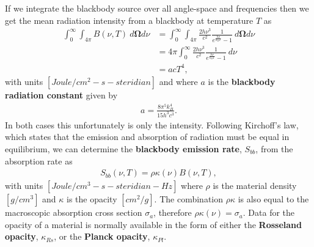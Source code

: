 \documentclass[10pt,letterpaper,notitlepage]{article}
\numberwithin{equation}{section}
\newcommand{\Omegabf}{\mathbf{\Omega}}
\newcommand{\beqn}{\begin{equation}\begin{aligned}}
\newcommand{\eeqn}{\end{aligned}\end{equation}}
\begin{document}
If we integrate the blackbody source over all angle-space and frequencies then we get the mean radiation intensity from a blackbody at temperature $T$ as
\beqn 
\int_0^\infty \int_{4\pi}  B(\nu, T) \ d\Omegabf d\nu
&=\int_0^\infty \int_{4\pi}  \frac{2h\nu^3}{c^2} \frac{1}{e^{\frac{h\nu}{k_B T}} - 1  } \ d\Omegabf d\nu \\
&=4\pi \int_0^\infty \frac{2h\nu^3}{c^2} \frac{1}{e^{\frac{h\nu}{k_B T}} - 1  } \  d\nu \\
&= a c T^4,
\eeqn 
with units $[Joule/cm^2 {-} s {-} steridian]$ and where $a$ is the \textbf{blackbody radiation constant} given by
\beqn 
a = \frac{8\pi^5 k_B^4}{15 h^3 c^3}.
\eeqn 
\newline
\newline
In both cases this unfortunately is only the intensity. Following Kirchoff's law, which states that the emission and absorption of radiation must be equal in equilibrium, we can determine the \textbf{blackbody emission rate}, $S_{bb}$, from the absorption rate as
\beqn 
S_{bb}(\nu, T) = \rho \kappa(\nu) B(\nu, T),
\eeqn 
with units $[Joule/cm^3 {-} s {-} steridian {-} Hz]$
where $\rho$ is the material density $[g/cm^3]$ and $\kappa$ is the opacity $[cm^2/g]$. The combination $\rho \kappa$ is also equal to the macroscopic absorption cross section $\sigma_a$, therefore $\rho \kappa(\nu) = \sigma_a$. Data for the opacity of a material is normally available in the form of either the \textbf{Rosseland opacity}, $\kappa_{Rs}$, or the \textbf{Planck opacity}, $\kappa_{Pl}$.

\newpage
\end{document}
